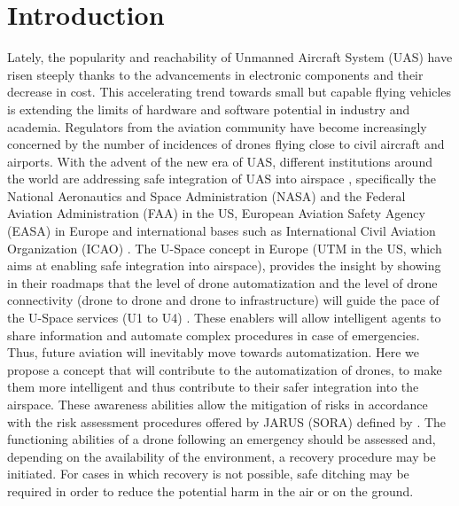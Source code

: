 
\chapter{Introduction}

Lately, the popularity and reachability of Unmanned Aircraft System (UAS) have risen steeply thanks to the advancements in electronic components and their decrease in cost. 
This accelerating trend towards small but capable flying vehicles is extending the limits of hardware and software potential in industry and academia.
Regulators from the aviation community have become increasingly concerned by the number of incidences of drones flying close to civil aircraft and airports. 
With the advent of the new era of UAS, different institutions around the world are addressing safe integration of UAS into airspace \cite{baskaya2016flexible}, specifically the National Aeronautics and Space Administration (NASA) 
\cite{kopardekarunmanned} and the Federal Aviation Administration (FAA) \cite{FAA_UASintegration} in the US, European Aviation Safety Agency (EASA) \cite{A_NPA_EASA2015} in Europe and international bases such as International Civil Aviation Organization (ICAO) \cite{ICAO_Circular}.
The U-Space concept in Europe (UTM in the US, which aims at enabling safe integration into airspace), provides the insight by showing in their roadmaps that the level of drone automatization and the level of drone connectivity (drone to drone and drone to infrastructure) will guide the pace of the U-Space services (U1 to U4) \cite{undertaking2017u}. 
These enablers will allow intelligent agents to share information and automate complex procedures in case of emergencies. 
Thus, future aviation will inevitably move towards automatization. 
Here we propose a concept that will contribute to the automatization of drones, to make them more intelligent and thus contribute to their safer integration into the airspace. 
These awareness abilities allow the mitigation of risks in accordance with the risk assessment procedures offered by JARUS (SORA) \cite{SORA} defined by \cite{EASAopinion2018}. 
The functioning abilities of a drone following an emergency should be assessed and, depending on the availability of the environment, a recovery procedure may be initiated. 
For cases in which recovery is not possible, safe ditching may be required in order to reduce the potential harm in the air or on the ground. 

